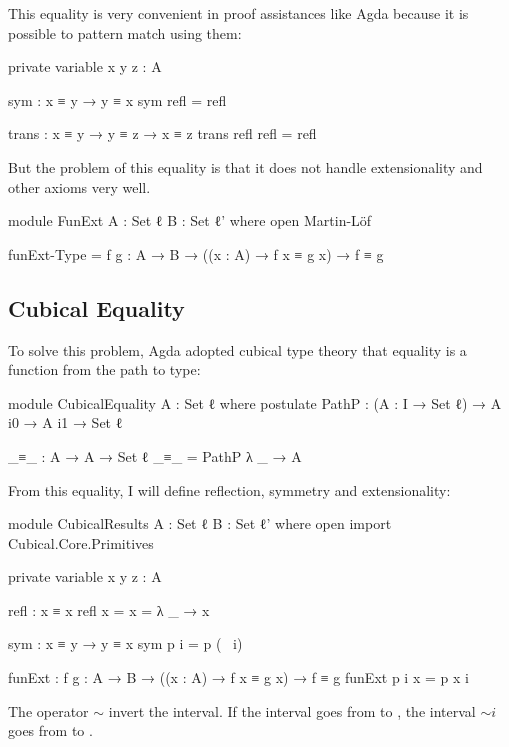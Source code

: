 \documentclass{article}
\begin{document}
This equality is very convenient in proof assistances like Agda because it is possible to pattern match using them:

\begin{code}
  private variable
    x y z : A

  sym  : x ≡ y → y ≡ x
  sym refl = refl

  trans : x ≡ y → y ≡ z → x ≡ z
  trans refl refl = refl
\end{code}

But the problem of this equality is that it does not handle extensionality and other axioms very well.

\begin{code}
module FunExt {A : Set ℓ} {B : Set ℓ'} where
  open Martin-Löf

  funExt-Type = {f g : A → B}
    → ((x : A) → f x ≡ g x) → f ≡ g
\end{code}

\subsection{Cubical Equality}

To solve this problem, Agda adopted cubical type theory that equality is a function from the path to type:

\begin{code}
module CubicalEquality {A : Set ℓ} where
  postulate
    PathP : (A : I → Set ℓ) → A i0 → A i1 → Set ℓ

  _≡_ : A → A → Set ℓ
  _≡_ = PathP λ _ → A
\end{code}

From this equality, I will define reflection, symmetry and extensionality:

\begin{code}
module CubicalResults {A : Set ℓ} {B : Set ℓ'} where
  open import Cubical.Core.Primitives

  private variable
    x y z : A

  refl : x ≡ x
  refl {x = x} = λ _ → x

  sym : x ≡ y → y ≡ x
  sym p i = p (~ i)

  funExt : {f g : A → B}
    → ((x : A) → f x ≡ g x) → f ≡ g
  funExt p i x = p x i
\end{code}

The operator $\sim$ invert the interval. If the interval  goes from
 to , the interval $\sim i$ goes from  to .
\end{document}
